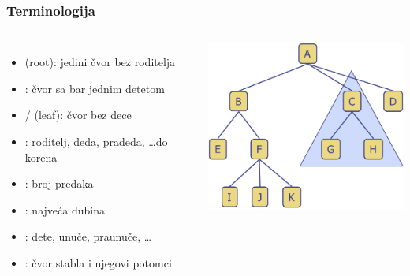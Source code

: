 \documentclass[compress,aspectratio=169]{beamer}
\begin{document}
\begin{frame}[fragile]
  \frametitle{Terminologija}
  \begin{columns}
    \column{9cm}
      \begin{itemize}
        \item {} (root): jedini čvor bez roditelja
        \item {}: čvor sa bar jednim detetom
        \item {}/ (leaf): čvor bez dece
        \item {}: roditelj, deda, pradeda, \ldots do korena
        \item {}: broj predaka
        \item {}: najveća dubina
        \item {}: dete, unuče, praunuče, \ldots
        \item {}: čvor stabla i njegovi potomci
      \end{itemize}
    \column{7cm}
      \begin{center}
        \includegraphics[width=7cm]{asp-08-pic02.png}
      \end{center}
  \end{columns}
\end{frame}
\end{document}
